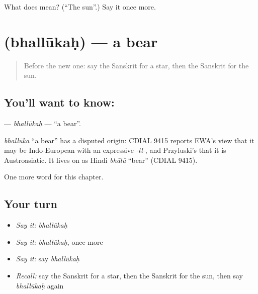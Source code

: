 \begin{tcolorbox}[breakable,colback=teal!4,colframe=teal!35!black,title={Before you move on}]
What does  mean? (\textquotedblleft{}The sun\textquotedblright{}.) Say it once more.
\end{tcolorbox}
\section[\texorpdfstring{\sk{भल्लूकः} (bhallūkaḥ)}{भल्लूकः (bhallūkaḥ)}]{ (bhallūkaḥ) — a bear}

\label{lesson:SA-C112-bhallukah}



\begin{quote}
Before the new one: say the Sanskrit for a star, then the Sanskrit for the sun.
\end{quote}

\subsection*{You'll want to know: }
\textbf{} — \emph{bhallūkaḥ} — \textquotedblleft{}a bear\textquotedblright{}.

\begin{cousinweb}
\emph{bhallūka} \textquotedblleft{}a bear\textquotedblright{} has a disputed origin: CDIAL 9415 reports EWA's view that it may be Indo-European with an expressive \emph{-ll-}, and Przyluski's that it is Austroasiatic. It lives on as Hindi \emph{bhālū} \textquotedblleft{}bear\textquotedblright{} (CDIAL 9415).
\end{cousinweb}

\begin{grammarlens}[title={What you've built}]
One more word for this chapter.
\end{grammarlens}

\subsection*{Your turn}
\begin{itemize}
\raggedright
  \item \emph{Say it:} \emph{bhallūkaḥ}
  \item \emph{Say it:} \emph{bhallūkaḥ}, once more
  \item \emph{Say it:} say \emph{bhallūkaḥ}
  \item \emph{Recall:} say the Sanskrit for a star, then the Sanskrit for the sun, then say \emph{bhallūkaḥ} again
\end{itemize}

